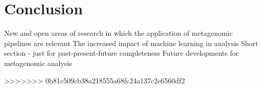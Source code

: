 \documentclass{article}
\begin{document}
\section*{Conclusion}
New and open areas of research in which the application of metagenomic pipelines are relevant
The increased impact of machine learning in analysis
Short section - just for past-present-future completeness
Future developments for metagenomic analysis

>>>>>>> 0b81c509cb38a218555a68fc24a137c2e6560df2


\end{document}
